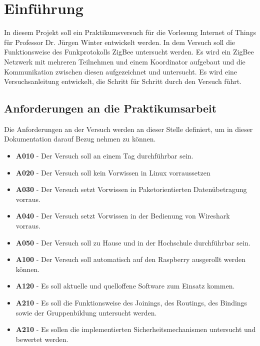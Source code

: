 \chapter{Einführung}

In diesem Projekt soll ein Praktikumsversuch für die Vorlesung Internet of Things für Professor Dr. Jürgen Winter 
entwickelt werden. In dem Versuch soll die Funktionsweise des Funkprotokolls ZigBee untersucht werden. Es wird ein 
ZigBee Netzwerk mit mehreren Teilnehmen und einem Koordinator aufgebaut und die Kommunikation zwischen diesen aufgezeichnet und untersucht. 
Es wird eine Versuchsanleitung entwickelt, die Schritt für Schritt durch den Versuch führt.

\section{Anforderungen an die Praktikumsarbeit}

Die Anforderungen an der Versuch werden an dieser Stelle definiert, um in dieser Dokumentation 
darauf Bezug nehmen zu können.
\begin{itemize}
    \item \textbf{A010} - Der Versuch soll an einem Tag durchführbar sein.
    \item \textbf{A020} - Der Versuch soll kein Vorwissen in Linux vorraussetzen
    \item \textbf{A030} - Der Versuch setzt Vorwissen in Paketorientierten Datenübetragung vorraus.
    \item \textbf{A040} - Der Versuch setzt Vorwissen in der Bedienung von Wireshark vorraus.
    \item \textbf{A050} - Der Versuch soll zu Hause und in der Hochschule durchführbar sein.
    \item \textbf{A100} - Der Versuch soll automatisch auf den Raspberry ausgerollt werden können.
    \item \textbf{A120} - Es soll aktuelle und quelloffene Software zum Einsatz kommen.
    \item \textbf{A210} - Es soll die Funktionsweise des Joinings, des Routings, des Bindings sowie der Gruppenbildung untersucht werden.
    \item \textbf{A210} - Es sollen die implementierten Sicherheitsmechanismen untersucht und bewertet werden.
\end{itemize}

